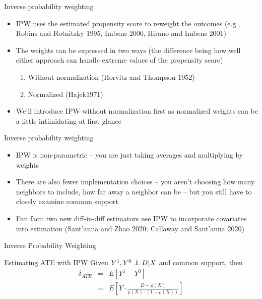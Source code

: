 \documentclass{beamer}
\newcommand\independent{\protect\mathpalette{\protect\independenT}{\perp}}
\def\independenT#1#2{\mathrel{\rlap{$#1#2$}\mkern2mu{#1#2}}}
\begin{document}
\begin{frame}{Inverse probability weighting}

\begin{itemize}
	\item IPW uses the estimated propensity score to reweight the outcomes (e.g., Robins and Rotnitzky 1995, Imbens 2000, Hirano and Imbens 2001)
	\item The weights can be expressed in two ways (the difference being how well either approach can handle extreme values of the propensity score)
		\begin{enumerate}
		\item Without normalization (Horvitz and Thompson 1952) 
		\item Normalized (Hajek1971) 
		\end{enumerate}
	\item We'll introduce IPW without normalization first as normalized weights can be a little intimidating at first glance
\end{itemize}

\end{frame}
	
\begin{frame}{Inverse probability weighting}

\begin{itemize}
	\item IPW is non-parametric -- you are just taking averages and multiplying by weights
	\item There are also fewer implementation choices -- you aren't choosing how many neighbors to include, how far away a neighbor can be -- but you still have to closely examine common support
	\item Fun fact: two new diff-in-diff estimators use IPW to incorporate covariates into estimation (Sant'anna and Zhao 2020; Callaway and Sant'anna 2020)
\end{itemize}

\end{frame}
	

\begin{frame}{Inverse Probability Weighting}
	
		\begin{block}{Estimating ATE with IPW}
	Given $Y^1,Y^0 \independent{D}|X$ and common support, then
		\begin{eqnarray*}
		\delta_{ATE}&=&E[Y^1-Y^0] \\
		&=&E \left[ Y \cdot  \frac{D - \rho(X)}{\rho(X) \cdot (1-\rho(X))} \right]
		\end{eqnarray*}
	\end{block}

\end{frame}
\end{document}
